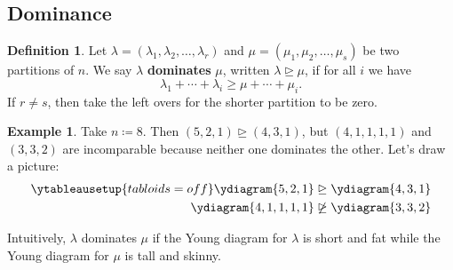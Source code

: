 \documentclass[12pt]{article}
\newcommand\paren[1]{\left( #1 \right)}
\theoremstyle{definition}
\newtheorem{definition}[theorem]{Definition}
\newtheorem{example}{Example}[section]
\begin{document}
\subsection{Dominance}
\begin{definition}
    Let $\lambda = \paren{ \lambda_1 , \lambda_2 , \dotsc , \lambda_r }$ and $\mu = \paren{ \mu_1 , \mu_2 , \dotsc , \mu_s }$ be two partitions of $n$. We say $\lambda$ \textbf{dominates} $\mu$, written $\lambda \trianglerighteq \mu$, if for all $i$ we have 
    \begin{equation}
        \lambda_1 + \dotsb + \lambda_i \geq \mu + \dotsb + \mu_i.
    \end{equation}
    If $r \neq s$, then take the left overs for the shorter partition to be zero.
\end{definition}
\begin{example}
    Take $n \coloneqq  8$. Then $(5,2,1) \trianglerighteq (4,3,1)$, but $(4,1,1,1,1)$ and $(3,3,2)$ are incomparable because neither one dominates the other. Let's draw a picture:
    \begin{equation}
        \begin{split}
            \ytableausetup{tabloids=off}
            \ydiagram{5,2,1} & \trianglerighteq \ydiagram{4,3,1} \\
            \ydiagram{4,1,1,1,1} & \not \trianglerighteq \ydiagram{3,3,2}
        \end{split}
    \end{equation}
\end{example}
Intuitively, $\lambda$ dominates $\mu$ if the Young diagram for $\lambda$ is short and fat while the Young diagram for $\mu$ is tall and skinny. 
\end{document}
